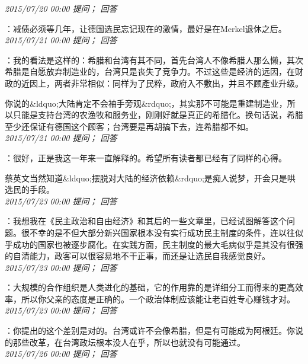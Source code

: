 \documentclass[twocolumn]{ctexart}
\begin{document}
\textit{\hfill\noindent\small 2015/07/20 00:00 提问； 回答}

：减债必须等几年，让德国选民忘记现在的激情，最好是在Merkel退休之后。\\

\textit{\hfill\noindent\small 2015/07/21 00:00 提问； 回答}

：我的看法是这样的：希腊和台湾有其不同，首先台湾人不像希腊人那么懒，其次希腊是自愿放弃制造业的，台湾只是丧失了竞争力。不过这些是经济的远因，在财政的近因上，两者非常相似：同样为了民粹，政府入不敷出，并且不顾產业升级。

你说的\&ldquo;大陆肯定不会袖手旁观\&rdquo;，其实那不可能是重建制造业，所以只能是支持台湾的农渔牧和服务业，刚刚好就是真正的希腊化。换句话说，希腊至少还保证有德国这个顾客；台湾要是再胡搞下去，连希腊都不如。\\

\textit{\hfill\noindent\small 2015/07/21 00:00 提问； 回答}

：很好，正是我这一年来一直解释的。希望所有读者都已经有了同样的心得。

蔡英文当然知道\&ldquo;摆脱对大陆的经济依赖\&rdquo;是痴人说梦，开会只是哄选民的手段。\\

\textit{\hfill\noindent\small 2015/07/23 00:00 提问； 回答}

：我想我在《民主政治和自由经济》和其后的一些文章里，已经试图解答这个问题。很不幸的是不但大部分新兴国家根本没有实行成功民主制度的条件，连以往似乎成功的国家也被逐步腐化。在实践方面，民主制度的最大毛病似乎是其没有很强的自清能力，政客可以很容易地不干正事，而还是让选民自我感觉良好。\\

\textit{\hfill\noindent\small 2015/07/23 00:00 提问； 回答}

：大规模的合作组织是人类进化的基础，它的作用靠的是详细分工而得来的更高效率，所以你父亲的态度是正确的。一个政治体制应该能让老百姓专心赚钱才对。\\

\textit{\hfill\noindent\small 2015/07/23 00:00 提问； 回答}

：你提出的这个差别是对的。台湾或许不会像希腊，但是有可能成为阿根廷。你说的那些改革，在台湾政坛根本没人在乎，所以也就没有可能通过。\\

\textit{\hfill\noindent\small 2015/07/26 00:00 提问； 回答}
\end{document}
